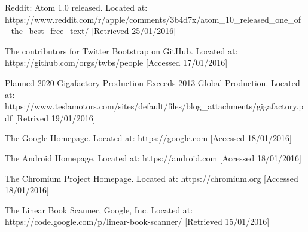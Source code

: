 \begin{thebibliography}{100}
 Reddit: Atom 1.0 released.
Located at: https://www.reddit.com/r/apple/comments/3b4d7x/atom\_10\_released\_one\_of\_the\_best\_free\_text/ [Retrieved 25/01/2016]

 The contributors for Twitter Bootstrap on GitHub.
	Located at: https://github.com/orgs/twbs/people [Accessed 17/01/2016]

 Planned 2020 Gigafactory Production Exceeds 2013 Global Production.
	Located at: https://www.teslamotors.com/sites/default/files/blog\_attachments/gigafactory.pdf [Retrived 19/01/2016]

 The Google Homepage.
    Located at: https://google.com [Accessed 18/01/2016]

 The Android Homepage.
    Located at: https://android.com [Accessed 18/01/2016]

 The Chromium Project Homepage.
    Located at: https://chromium.org [Accessed 18/01/2016]

 The Linear Book Scanner,
  Google, Inc.
  Located at: https://code.google.com/p/linear-book-scanner/ [Retrieved 15/01/2016]


\end{thebibliography}

\newpage{\pagestyle{empty}\cleardoublepage}
